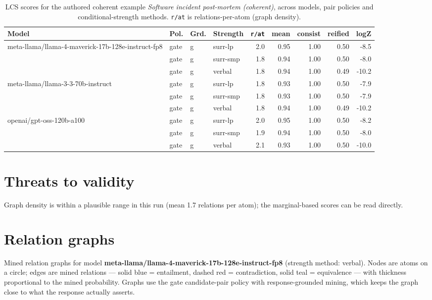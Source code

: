\documentclass[11pt]{article}
\begin{document}
\begin{table}[htbp]
\centering
\footnotesize
\setlength{\tabcolsep}{4pt}
\caption{LCS scores for the authored coherent example \emph{Software incident post-mortem (coherent)}, across models, pair policies and conditional-strength methods. \texttt{r/at} is relations-per-atom (graph density).}
\label{tab:coherent}
\begin{tabular}{llllrrrrr}
\toprule
\textbf{Model} & \textbf{Pol.} & \textbf{Grd.} & \textbf{Strength} & \texttt{r/at} & mean & consist & reified & logZ \\
\midrule
meta-llama/llama-4-maverick-17b-128e-instruct-fp8 & gate & g & surr-lp & 2.0 & 0.95 & 1.00 & 0.50 & -8.5 \\
 & gate & g & surr-smp & 1.8 & 0.94 & 1.00 & 0.50 & -8.0 \\
 & gate & g & verbal & 1.8 & 0.94 & 1.00 & 0.49 & -10.2 \\
\midrule
meta-llama/llama-3-3-70b-instruct & gate & g & surr-lp & 1.8 & 0.93 & 1.00 & 0.50 & -7.9 \\
 & gate & g & surr-smp & 1.8 & 0.93 & 1.00 & 0.50 & -7.9 \\
 & gate & g & verbal & 1.8 & 0.94 & 1.00 & 0.49 & -10.2 \\
\midrule
openai/gpt-oss-120b-a100 & gate & g & surr-lp & 2.0 & 0.95 & 1.00 & 0.50 & -8.2 \\
 & gate & g & surr-smp & 1.9 & 0.94 & 1.00 & 0.50 & -8.0 \\
 & gate & g & verbal & 2.1 & 0.93 & 1.00 & 0.50 & -10.0 \\
\bottomrule
\end{tabular}
\end{table}


\section{Threats to validity}

Graph density is within a plausible range in this run (mean 1.7 relations per atom); the marginal-based scores can be read directly.

\section{Relation graphs}\label{sec:graphs}

Mined relation graphs for model \textbf{meta-llama/llama-4-maverick-17b-128e-instruct-fp8} (strength method: verbal). Nodes are atoms on a circle; edges are mined relations --- solid blue = entailment, dashed red = contradiction, solid teal = equivalence --- with thickness proportional to the mined probability. Graphs use the gate candidate-pair policy with response-grounded mining, which keeps the graph close to what the response actually asserts.
\end{document}
